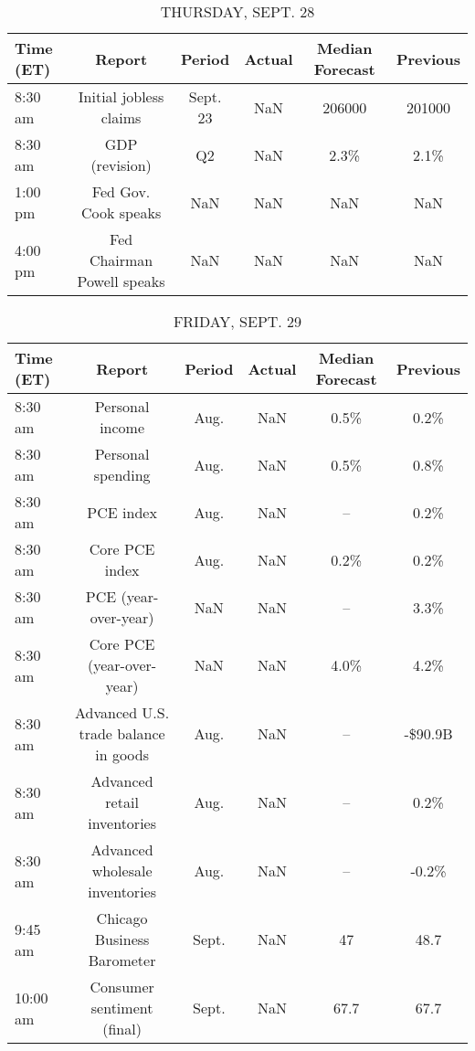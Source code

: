 \documentclass{article}%
\begin{document}
%


\begin{table}[htbp]%
\caption{THURSDAY, SEPT. 28}%
\centering%
\begin{adjustbox}{width=1\textwidth}%
\begin{tabular}{lccccc}
\toprule
Time (ET) &                     Report &   Period & Actual & Median Forecast & Previous \\
\midrule
  8:30 am &     Initial jobless claims & Sept. 23 &    NaN &          206000 &   201000 \\
  8:30 am &             GDP (revision) &       Q2 &    NaN &            2.3\% &     2.1\% \\
  1:00 pm &       Fed Gov. Cook speaks &      NaN &    NaN &             NaN &      NaN \\
  4:00 pm & Fed Chairman Powell speaks &      NaN &    NaN &             NaN &      NaN \\
\bottomrule
\end{tabular}
%
\end{adjustbox}%
\end{table}

%


\begin{table}[htbp]%
\caption{FRIDAY, SEPT. 29}%
\centering%
\begin{adjustbox}{width=1\textwidth}%
\begin{tabular}{lccccc}
\toprule
Time (ET) &                               Report & Period & Actual & Median Forecast & Previous \\
\midrule
  8:30 am &                      Personal income &   Aug. &    NaN &            0.5\% &     0.2\% \\
  8:30 am &                    Personal spending &   Aug. &    NaN &            0.5\% &     0.8\% \\
  8:30 am &                            PCE index &   Aug. &    NaN &              -- &     0.2\% \\
  8:30 am &                       Core PCE index &   Aug. &    NaN &            0.2\% &     0.2\% \\
  8:30 am &                 PCE (year-over-year) &    NaN &    NaN &              -- &     3.3\% \\
  8:30 am &            Core PCE (year-over-year) &    NaN &    NaN &            4.0\% &     4.2\% \\
  8:30 am & Advanced U.S. trade balance in goods &   Aug. &    NaN &              -- &  -\$90.9B \\
  8:30 am &          Advanced retail inventories &   Aug. &    NaN &              -- &     0.2\% \\
  8:30 am &       Advanced wholesale inventories &   Aug. &    NaN &              -- &    -0.2\% \\
  9:45 am &           Chicago Business Barometer &  Sept. &    NaN &              47 &     48.7 \\
 10:00 am &           Consumer sentiment (final) &  Sept. &    NaN &            67.7 &     67.7 \\
\bottomrule
\end{tabular}
%
\end{adjustbox}%
\end{table}
\end{document}
